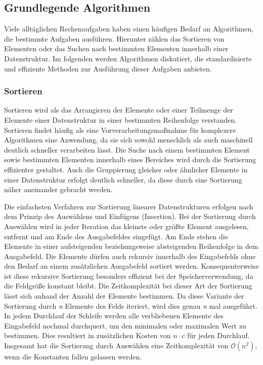 \subsection{Grundlegende Algorithmen}
Viele alltäglichen Rechenaufgaben haben einen häufigen Bedarf an Algorithmen, die bestimmte Aufgaben ausführen. Hierunter zählen das Sortieren von Elementen oder das Suchen nach bestimmten Elementen innerhalb einer Datenstruktur. Im folgenden werden Algorithmen diskutiert, die standardisierte und effiziente Methoden zur Ausführung dieser Aufgaben anbieten.

\subsubsection{Sortieren}
Sortieren wird als das Arrangieren der Elemente oder einer Teilmenge der Elemente einer Datenstruktur in einer bestimmten Reihenfolge verstanden. Sortieren findet häufig als eine Vorverarbeitungsmaßnahme für komplexere Algorithmen eine Anwendung, da sie sich sowohl menschlich als auch maschinell deutlich schneller verarbeiten lässt. Die Suche nach einem bestimmten Element sowie bestimmten Elementen innerhalb eines Bereiches wird durch die Sortierung effizienter gestaltet. Auch die Gruppierung gleicher oder ähnlicher Elemente in einer Datenstruktur erfolgt deutlich schneller, da diese durch eine Sortierung näher aneinander gebracht werden. \autocite[153-154]{sanders_sequential_2019}

Die einfachsten Verfahren zur Sortierung linearer Datenstrukturen erfolgen nach dem Prinzip des Auswählens und Einfügens (Insertion). Bei der Sortierung durch Auswählen wird in jeder Iteration das kleinste oder größte Element ausgelesen, entfernt und am Ende des Ausgabefeldes eingefügt. Am Ende stehen die Elemente in einer aufsteigenden beziehungsweise absteigenden Reihenfolge in dem Ausgabefeld. Die Elemente dürfen auch rekursiv innerhalb des Eingabefelds ohne den Bedarf an einem zusätzlichen Ausgabefeld sortiert werden. Konsequenterweise ist diese rekursive Sortierung besonders effizient bei der Speicherverwendung, da die Feldgröße konstant bleibt. Die Zeitkomplexität bei dieser Art der Sortierung lässt sich anhand der Anzahl der Elemente bestimmen. Da diese Variante der Sortierung durch \textit{n} Elemente des Felds iteriert, wird dies genau \textit{n} mal ausgeführt. In jedem Durchlauf der Schleife werden alle verbliebenen Elemente des Eingabefeld nochmal durchquert, um den minimalen oder maximalen Wert zu bestimmen. Dies resultiert in zusätzlichen Kosten von $n\cdot c$ für jeden Durchlauf. Insgesamt hat die Sortierung durch Auswählen eine Zeitkomplexität von $\mathcal{O}(n^2)$, wenn die Konstanten fallen gelassen werden. \autocite[156]{sanders_sequential_2019} \autocite[212]{hubwieser_fundamente_2015}

